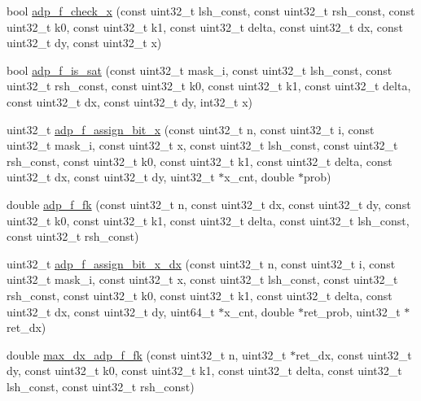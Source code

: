 \begin{DoxyCompactItemize}
\item 
bool \hyperlink{adp-tea-f-fk_8hh_a0f6202112f8d6e5030468311d4dfe5b0}{adp\-\_\-f\-\_\-check\-\_\-x} (const uint32\-\_\-t lsh\-\_\-const, const uint32\-\_\-t rsh\-\_\-const, const uint32\-\_\-t k0, const uint32\-\_\-t k1, const uint32\-\_\-t delta, const uint32\-\_\-t dx, const uint32\-\_\-t dy, const uint32\-\_\-t x)
\item 
bool \hyperlink{adp-tea-f-fk_8hh_a08aeb7cc83aaf6bd1f9a3758f45112b4}{adp\-\_\-f\-\_\-is\-\_\-sat} (const uint32\-\_\-t mask\-\_\-i, const uint32\-\_\-t lsh\-\_\-const, const uint32\-\_\-t rsh\-\_\-const, const uint32\-\_\-t k0, const uint32\-\_\-t k1, const uint32\-\_\-t delta, const uint32\-\_\-t dx, const uint32\-\_\-t dy, int32\-\_\-t x)
\item 
uint32\-\_\-t \hyperlink{adp-tea-f-fk_8hh_aeaf46be11e7c500a368d08cf6f32acb6}{adp\-\_\-f\-\_\-assign\-\_\-bit\-\_\-x} (const uint32\-\_\-t n, const uint32\-\_\-t i, const uint32\-\_\-t mask\-\_\-i, const uint32\-\_\-t x, const uint32\-\_\-t lsh\-\_\-const, const uint32\-\_\-t rsh\-\_\-const, const uint32\-\_\-t k0, const uint32\-\_\-t k1, const uint32\-\_\-t delta, const uint32\-\_\-t dx, const uint32\-\_\-t dy, uint32\-\_\-t $\ast$x\-\_\-cnt, double $\ast$prob)
\item 
double \hyperlink{adp-tea-f-fk_8hh_a197140aa874649bb8dc119db47f6b139}{adp\-\_\-f\-\_\-fk} (const uint32\-\_\-t n, const uint32\-\_\-t dx, const uint32\-\_\-t dy, const uint32\-\_\-t k0, const uint32\-\_\-t k1, const uint32\-\_\-t delta, const uint32\-\_\-t lsh\-\_\-const, const uint32\-\_\-t rsh\-\_\-const)
\item 
uint32\-\_\-t \hyperlink{adp-tea-f-fk_8hh_aa85b9197280f9256f76aac08b5e2ea0c}{adp\-\_\-f\-\_\-assign\-\_\-bit\-\_\-x\-\_\-dx} (const uint32\-\_\-t n, const uint32\-\_\-t i, const uint32\-\_\-t mask\-\_\-i, const uint32\-\_\-t x, const uint32\-\_\-t lsh\-\_\-const, const uint32\-\_\-t rsh\-\_\-const, const uint32\-\_\-t k0, const uint32\-\_\-t k1, const uint32\-\_\-t delta, const uint32\-\_\-t dx, const uint32\-\_\-t dy, uint64\-\_\-t $\ast$x\-\_\-cnt, double $\ast$ret\-\_\-prob, uint32\-\_\-t $\ast$ret\-\_\-dx)
\item 
double \hyperlink{adp-tea-f-fk_8hh_a51a32e1be5232b4b96d539b64171009a}{max\-\_\-dx\-\_\-adp\-\_\-f\-\_\-fk} (const uint32\-\_\-t n, uint32\-\_\-t $\ast$ret\-\_\-dx, const uint32\-\_\-t dy, const uint32\-\_\-t k0, const uint32\-\_\-t k1, const uint32\-\_\-t delta, const uint32\-\_\-t lsh\-\_\-const, const uint32\-\_\-t rsh\-\_\-const)

\end{DoxyCompactItemize}
